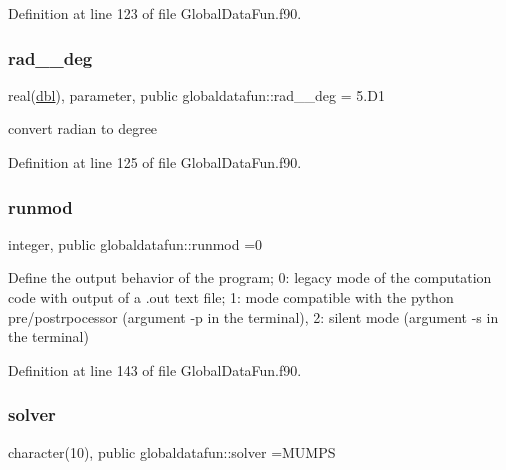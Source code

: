 Definition at line 123 of file Global\+Data\+Fun.\+f90.

\mbox{\label{namespaceglobaldatafun_a65560765d885097ca1432983f9cf6bab}} 
\subsubsection{\texorpdfstring{rad\+\_\+\_\+deg}{rad\_2\_deg}}
{\footnotesize\ttfamily real(\hyperlink{namespaceglobaldatafun_a5008801201dd34f2af8eae07756befb4}{dbl}), parameter, public globaldatafun\+::rad\+\_\+\_\+deg = 5.\+D1}



convert radian to degree 



Definition at line 125 of file Global\+Data\+Fun.\+f90.

\mbox{\label{namespaceglobaldatafun_a69fb7d8f3bbcc95ea17d1f924b50fbfa}} 
\subsubsection{\texorpdfstring{runmod}{runmod}}
{\footnotesize\ttfamily integer, public globaldatafun\+::runmod =0}



Define the output behavior of the program; 0\+: legacy mode of the computation code with output of a .out text file; 1\+: mode compatible with the python pre/postrpocessor (argument -\/p in the terminal), 2\+: silent mode (argument -\/s in the terminal) 



Definition at line 143 of file Global\+Data\+Fun.\+f90.

\mbox{\label{namespaceglobaldatafun_a895a1e10c59021323fcf518893f6c0de}} 
\subsubsection{\texorpdfstring{solver}{solver}}
{\footnotesize\ttfamily character(10), public globaldatafun\+::solver =\textquotesingle{}M\+U\+M\+PS\textquotesingle{}}



